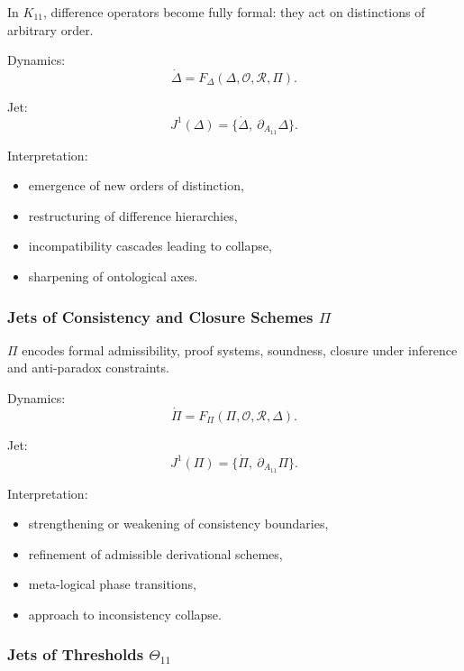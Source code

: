In $K_{11}$, difference operators become fully formal:
they act on distinctions of arbitrary order.

Dynamics:
\[
\dot{\Delta}
=
F_{\Delta}(\Delta,\mathcal{O},\mathcal{R},\Pi).
\]

Jet:
\[
J^1(\Delta)=\{\dot{\Delta},\ \partial_{A_{11}}\Delta\}.
\]

Interpretation:
\begin{itemize}
    \item emergence of new orders of distinction,
    \item restructuring of difference hierarchies,
    \item incompatibility cascades leading to collapse,
    \item sharpening of ontological axes.
\end{itemize}


\subsubsection{Jets of Consistency and Closure Schemes \texorpdfstring{$\Pi$}{\Pi}}

$\Pi$ encodes formal admissibility, proof systems, soundness,
closure under inference and anti-paradox constraints.

Dynamics:
\[
\dot{\Pi}
=
F_{\Pi}(\Pi,\mathcal{O},\mathcal{R},\Delta).
\]

Jet:
\[
J^1(\Pi)=\{\dot{\Pi},\ \partial_{A_{11}}\Pi\}.
\]

Interpretation:
\begin{itemize}
    \item strengthening or weakening of consistency boundaries,
    \item refinement of admissible derivational schemes,
    \item meta-logical phase transitions,
    \item approach to inconsistency collapse.
\end{itemize}


\subsubsection{Jets of Thresholds $\Theta_{11}$}

